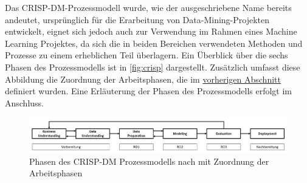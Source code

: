 Das CRISP-DM-Prozessmodell wurde, wie der ausgeschriebene Name bereits andeutet, ursprünglich für die Erarbeitung von Data-Mining-Projekten entwickelt, eignet sich jedoch auch zur Verwendung im Rahmen eines Machine Learning Projektes, da sich die in beiden Bereichen verwendeten Methoden und Prozesse zu einem erheblichen Teil überlagern. Ein Überblick über die sechs Phasen des Prozessmodells ist in \autoref{fig:crisp} dargestellt. Zusätzlich umfasst diese Abbildung die Zuordnung der Arbeitsphasen, die im \hyperref[phases_definition]{vorherigen Abschnitt} definiert wurden. Eine Erläuterung der Phasen des Prozessmodells erfolgt im Anschluss. 

\begin{figure}[ht]
    \centering
    \includegraphics[width=\textwidth]{images/CRISP-DM}
    \caption{Phasen des CRISP-DM Prozessmodells nach \cite{Chapman2000} mit Zuordnung der Arbeitsphasen}\label{fig:crisp}
\end{figure}

